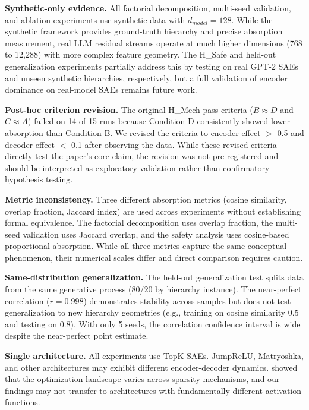 \documentclass{article}
\begin{document}
\textbf{Synthetic-only evidence.} All factorial decomposition, multi-seed validation, and ablation experiments use synthetic data with $d_{model} = 128$. While the synthetic framework provides ground-truth hierarchy and precise absorption measurement, real LLM residual streams operate at much higher dimensions (768 to 12,288) with more complex feature geometry. The H\_Safe and held-out generalization experiments partially address this by testing on real GPT-2 SAEs and unseen synthetic hierarchies, respectively, but a full validation of encoder dominance on real-model SAEs remains future work.

\textbf{Post-hoc criterion revision.} The original H\_Mech pass criteria ($B \approx D$ and $C \approx A$) failed on 14 of 15 runs because Condition D consistently showed lower absorption than Condition B. We revised the criteria to encoder effect $>$ 0.5 and decoder effect $<$ 0.1 after observing the data. While these revised criteria directly test the paper's core claim, the revision was not pre-registered and should be interpreted as exploratory validation rather than confirmatory hypothesis testing.

\textbf{Metric inconsistency.} Three different absorption metrics (cosine similarity, overlap fraction, Jaccard index) are used across experiments without establishing formal equivalence. The factorial decomposition uses overlap fraction, the multi-seed validation uses Jaccard overlap, and the safety analysis uses cosine-based proportional absorption. While all three metrics capture the same conceptual phenomenon, their numerical scales differ and direct comparison requires caution.

\textbf{Same-distribution generalization.} The held-out generalization test splits data from the same generative process (80/20 by hierarchy instance). The near-perfect correlation ($r = 0.998$) demonstrates stability across samples but does not test generalization to new hierarchy geometries (e.g., training on cosine similarity 0.5 and testing on 0.8). With only 5 seeds, the correlation confidence interval is wide despite the near-perfect point estimate.

\textbf{Single architecture.} All experiments use TopK SAEs. JumpReLU, Matryoshka, and other architectures may exhibit different encoder-decoder dynamics. \citet{marks2025} showed that the optimization landscape varies across sparsity mechanisms, and our findings may not transfer to architectures with fundamentally different activation functions.
\end{document}
